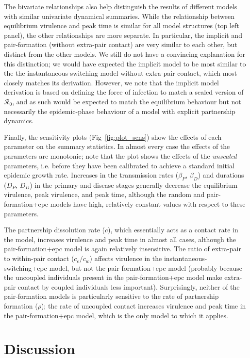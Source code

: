 \documentclass[10pt,letterpaper]{article}
\renewcommand{\figurename}{Fig}
\newcommand{\rzero}{{\mathcal R}_0}
\begin{document}
The bivariate relationships also help distinguish the results of 
different models with similar univariate dynamical summaries. While the
relationship between equilibrium virulence and peak time is
similar for all model structures (top left panel), the other
relationships are more separate. In particular, the implicit
and pair-formation (without extra-pair contact) are very similar
to each other, but distinct from the other models. We still do
not have a convincing explanation for this distinction; we
would have expected the implicit model to be most similar to the
the instantaneous-switching model without extra-pair contact,
which most closely matches its derivation. However, we note
that the implicit model derivation is based on defining
the force of infection to match a scaled version of $\rzero$,
and as such would be expected to match the equilibrium behaviour
but not necessarily the epidemic-phase behaviour of a model
with explicit partnership dynamics.

Finally, the sensitivity plots (\figurename~\ref{fig:plot_sens}) show the effects 
of each parameter on the summary statistics. In almost every case the
effects of the parameters are monotonic; note that
the plot shows the effects of the \emph{unscaled} parameters, i.e.
before they have been calibrated to achieve a standard initial epidemic
growth rate.
Increases in the transmission rates ($\beta_P$, $\beta_D$)
and durations ($D_P$, $D_D$) in the primary and disease stages generally
decrease the equilibrium virulence, peak virulence, and peak time,
although the random and pair-formation+epc 
models have high, relatively
constant values with respect to these parameters. 

The partnership dissolution rate ($c$), which essentially
acts as a contact rate in the model,
increases virulence and peak time in almost all
cases, although the pair-formation+epc
model is again relatively insensitive.
The ratio of extra-pair to within-pair contact ($c_e/c_w$) affects
virulence in the instantaneous-switching+epc model, but not the pair-formation+epc
model (probably because the uncoupled individuals present in the pair-formation+epc
model make extra-pair contact by coupled individuals less important).
Surprisingly, neither of the pair-formation models is particularly sensitive to the 
rate of partnership formation ($\rho$); the rate of uncoupled contact
increases virulence and peak time in the pair-formation+epc model, 
which is the only model to which it applies.

\section*{Discussion}
\end{document}
